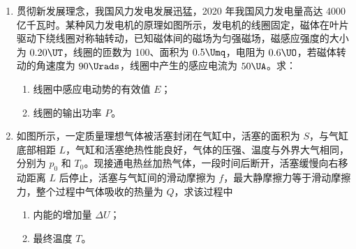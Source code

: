 \documentclass[\gkver]{gaokaozhenti}
\begin{document}
\begin{enumerate}
\item
贯彻新发展理念，我国风力发电发展迅猛，2020 年我国风力发电量高达 4000 亿千瓦时。某种风力发电机的原理如图所示，发电机的线圈固定，磁体在叶片驱动下绕线圈对称轴转动，已知磁体间的磁场为匀强磁场，磁感应强度的大小为 $0.20\UT$，线圈的匝数为 100、面积为 $0.5\Umq$，电阻为 $0.6\UO$，若磁体转动的角速度为 $90\Urads$，线圈中产生的感应电流为 $50\UA$。求：
\begin{enumerate}
	\item
	线圈中感应电动势的有效值 $E$；
	\item
	线圈的输出功率 $P$。
\end{enumerate}



\item
如图所示，一定质量理想气体被活塞封闭在气缸中，活塞的面积为 $S$，与气缸底部相距 $L$，气缸和活塞绝热性能良好，气体的压强、温度与外界大气相同，分别为 $p_{0}$ 和 $T_{0}$。现接通电热丝加热气体，一段时间后断开，活塞缓慢向右移动距离 $L$ 后停止，活塞与气缸间的滑动摩擦为 $f$，最大静摩擦力等于滑动摩擦力，整个过程中气体吸收的热量为 $Q$，求该过程中
\begin{enumerate}
	\item
	内能的增加量 $\Delta U$；
	\item
	最终温度 $T$。
\end{enumerate}


\end{enumerate}
\end{document}

